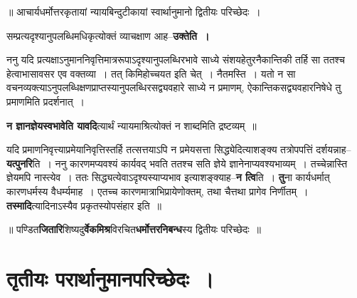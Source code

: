 \documentclass[article,12pt,a4paper]{memoir}
\begin{document}
	  \pstart ॥ आचार्यधर्मोत्तरकृतायां न्यायबिन्दुटीकायां स्वार्थानुमानो द्वितीयः परिच्छेदः ।
	\pend
      
	  \endgroup
	

	  \pstart सम्प्रत्यदृश्यानुपलब्धिमधिकृत्योक्तं व्याचक्षाण आह--\textbf{उक्तेति ।}
	\pend
      

	  \pstart ननु यदि प्रत्यक्षाऽनुमाननिवृत्तिमात्ररूपाऽदृश्यानुपलब्धिरभावे साध्ये संशयहेतुरनैकान्तिकी तर्हि सा ततश्च हेत्वाभासावसर एव वक्तव्या । तत् किमिहोच्चयत इति चेत् । नैतमस्ति । यतो न सा वचनव्यक्त्याऽनुपलब्धिक्षणप्राप्तस्यानुपलब्धिरसद्व्यवहारे साध्ये न प्रमाणम्, ऐकान्तिकसद्व्यवहारनिषेधे तु प्रमाणमिति प्रदर्शनात् ।
	\pend
      

	  \pstart \textbf{न ज्ञानज्ञेयस्वभावेति यावदि}त्यार्थं न्यायमाश्रित्योक्तं न शाब्दमिति द्रष्टव्यम् ॥
	\pend
      

	  \pstart यदि प्रमाणनिवृत्त्या\leavevmode{}प्रमेयानिवृत्तिस्तर्हि तत्सत्तयाऽपि न प्रमेयसत्ता सिद्ध्येदित्याशङ्क्य तत्रोपपत्तिं दर्शयन्नाह--\textbf{यत्पुनरि}ति । ननु कारणमप्यवश्यं कार्यवद् भवति ततश्च सति ज्ञेये ज्ञानेनाप्यवश्यभाव्यम् । तच्चेन्नास्ति ज्ञेयमपि नास्त्येव । ततः सिद्ध्यत्येवाऽदृश्यस्याप्यभाव इत्याशङ्क्याह--\textbf{न त्वि}ति । \textbf{तु}ना कार्यधर्मात् कारणधर्मस्य वैधर्म्यमाह । एतच्च कारणमात्राभिप्रायेणोक्तम्, तथा चैत्तथा प्रागेव निर्णीतम् । \textbf{तस्मादि}त्यादिनाऽस्यैव प्रकृतस्योपसंहार इति ॥
	\pend
      

	  \pstart ॥ पण्डित\textbf{जितारि}शिष्यदु\textbf{र्वेकमिश्र}विरचित\textbf{धर्मोत्तरनिबन्ध}स्य द्वितीयः परिच्छेदः ॥
	\pend
      
	    
	    \endnumbering%
	    \endgroup
	    
	  
	  
	
	    
	    \begingroup
	    \beginnumbering%
	    
	  
\chapter[{तृतीयः परार्थानुमानपरिच्छेदः ।}]{तृतीयः परार्थानुमानपरिच्छेदः ।}
	  \bigskip
	  \begingroup
	
\end{document}
